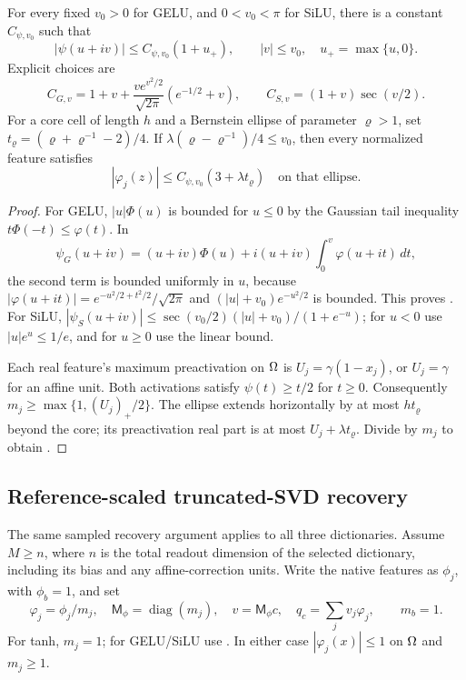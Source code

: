 \begin{lemma}
\label{lem:psi-strip-growth}
For every fixed $v_0>0$ for GELU, and $0<v_0<\pi$ for SiLU, there is a
constant $C_{\psi,v_0}$ such that
\begin{equation}
 |\psi(u+iv)|\le C_{\psi,v_0}(1+u_+),\qquad |v|\le v_0,
 \quad u_+=\max\{u,0\}.
 \label{eq:psi-strip-growth}
\end{equation}
Explicit choices are
\begin{equation}
 C_{G,v}=1+v+\frac{v e^{v^2/2}}{\sqrt{2\pi}}(e^{-1/2}+v),
 \qquad C_{S,v}=(1+v)\sec(v/2).
 \label{eq:psi-strip-constants}
\end{equation}
For a core cell of length $h$ and a Bernstein ellipse of parameter
$\varrho>1$, set $t_\varrho=(\varrho+\varrho^{-1}-2)/4$.
If $\lambda(\varrho-\varrho^{-1})/4\le v_0$, then every normalized feature
satisfies
\begin{equation}
 |\varphi_j(z)|\le C_{\psi,v_0}(3+\lambda t_\varrho)
 \quad\text{on that ellipse}.
 \label{eq:psi-ellipse-bound}
\end{equation}
\end{lemma}
\begin{proof}
For GELU, $|u|\Phi(u)$ is bounded for $u\le0$ by the Gaussian tail
inequality $t\Phi(-t)\le\varphi(t)$. In
\[
 \psi_G(u+iv)=(u+iv)\Phi(u)
        +i(u+iv)\int_0^v\varphi(u+it)\,dt,
\]
the second term is bounded uniformly in $u$, because
$|\varphi(u+it)|=e^{-u^2/2+t^2/2}/\sqrt{2\pi}$ and
$(|u|+v_0)e^{-u^2/2}$ is bounded. This proves .
For SiLU,
$|\psi_S(u+iv)|\le\sec(v_0/2)(|u|+v_0)/(1+e^{-u})$;
for $u<0$ use $|u|e^{u}\le1/e$, and for $u\ge0$ use the linear bound.

Each real feature's maximum preactivation on $\Omega$ is $U_j=\gamma(1-x_j)$,
or $U_j=\gamma$ for an affine unit. Both activations satisfy
$\psi(t)\ge t/2$ for $t\ge0$. Consequently
$m_j\ge\max\{1,(U_j)_+/2\}$. The ellipse extends horizontally by at most
$h t_\varrho$ beyond the core; its preactivation real part is at most
$U_j+\lambda t_\varrho$. Divide  by $m_j$ to
obtain .
\end{proof}

\subsection{Reference-scaled truncated-SVD recovery}
\label{sec:recovery}
The same sampled recovery argument applies to all three dictionaries.
Assume $M\ge n$, where $n$ is the total readout dimension of the selected
dictionary, including its bias and any affine-correction units. Write the native features as $\phi_j$, with $\phi_b=1$, and set
\begin{equation}
 \varphi_j=\phi_j/m_j,\quad
 \mathsf M_\phi=\operatorname{diag}(m_j),\quad v=\mathsf M_\phi c,
 \quad q_c=\sum_jv_j\varphi_j,
 \qquad m_b=1.
 \label{eq:normalized-dictionary}
\end{equation}
For tanh, $m_j=1$; for GELU/SiLU use
. In either case $|\varphi_j(x)|\le1$
on $\Omega$ and $m_j\ge1$.

